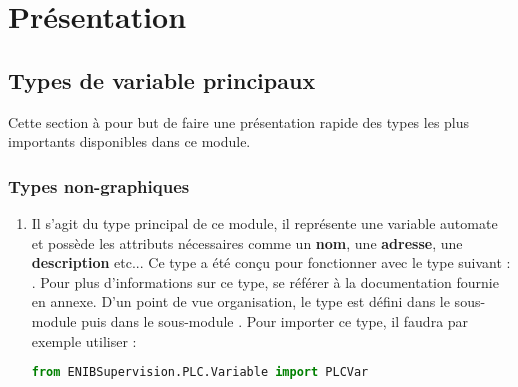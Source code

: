 \documentclass[12pt]{report}    %
\begin{document}
\chapter{Présentation}

\section{Types de variable principaux}

Cette section à pour but de faire une présentation rapide des types les plus importants disponibles dans ce module.

\subsection{Types non-graphiques}

\begin{enumerate}

\item \label{tag-presentation-PLCVar}  \newline
Il s'agit du type principal de ce module, il représente une variable automate et possède les attributs nécessaires comme un \textbf{nom}, une \textbf{adresse}, une \textbf{description} etc... Ce type a été conçu pour fonctionner avec le type suivant : .\newline
Pour plus d'informations sur ce type, se référer à la documentation fournie en annexe.\newline
D'un point de vue organisation, le type  est défini dans le sous-module  puis dans le sous-module . \newline
Pour importer ce type, il faudra par exemple utiliser :
\begin{lstlisting}[language=Python]
from ENIBSupervision.PLC.Variable import PLCVar
\end{lstlisting}


\end{enumerate}
\end{document}
